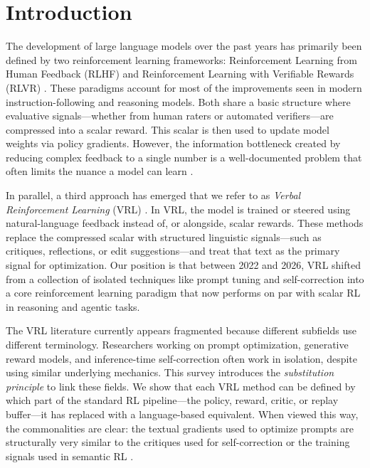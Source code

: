 \section{Introduction}
\label{sec:introduction}

The development of large language models over the past years has primarily been defined by two reinforcement learning frameworks: Reinforcement Learning from Human Feedback (RLHF) \citep{ouyang2022training,christiano2017deep} and Reinforcement Learning with Verifiable Rewards (RLVR) \citep{guo2025deepseek, chen2026does}. These paradigms account for most of the improvements seen in modern instruction-following and reasoning models. Both share a basic structure where evaluative signals—whether from human raters or automated verifiers—are compressed into a scalar reward. This scalar is then used to update model weights via policy gradients. However, the information bottleneck created by reducing complex feedback to a single number is a well-documented problem that often limits the nuance a model can learn \citep{casper2023open, singhal2023long}.

In parallel, a third approach has emerged that we refer to as \textit{Verbal Reinforcement Learning} (VRL) \citep{shinn2023reflexion}. In VRL, the model is trained or steered using natural-language feedback instead of, or alongside, scalar rewards. These methods replace the compressed scalar with structured linguistic signals—such as critiques, reflections, or edit suggestions—and treat that text as the primary signal for optimization. Our position is that between 2022 and 2026, VRL shifted from a collection of isolated techniques like prompt tuning and self-correction into a core reinforcement learning paradigm that now performs on par with scalar RL in reasoning and agentic tasks.

The VRL literature currently appears fragmented because different subfields use different terminology. Researchers working on prompt optimization, generative reward models, and inference-time self-correction often work in isolation, despite using similar underlying mechanics. This survey introduces the \textit{substitution principle} to link these fields. We show that each VRL method can be defined by which part of the standard RL pipeline—the policy, reward, critic, or replay buffer—it has replaced with a language-based equivalent. When viewed this way, the commonalities are clear: the textual gradients used to optimize prompts \citep{pryzant2023protegi} are structurally very similar to the critiques used for self-correction \citep{madaan2023selfrefine} or the training signals used in semantic RL \citep{wang2025cft}.

